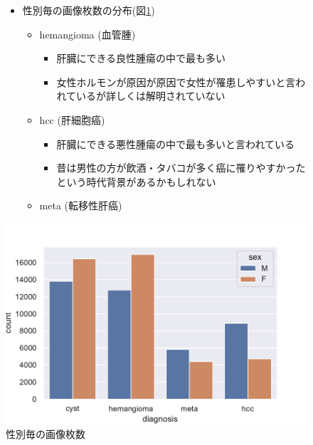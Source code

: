 \documentclass[a4j]{ujarticle}
\newcommand{\Fref}[1]{\mbox{図\ref{fig:#1}}}
\begin{document}
\begin{itemize}
			\begin{figure}[ht]
				\begin{minipage}{.59\textwidth}
					\begin{itemize}
						\item 性別毎の画像枚数の分布(\Fref{sex})
						\begin{itemize}
							\item hemangioma (血管腫)
							\begin{itemize}
								\item 肝臓にできる良性腫瘍の中で最も多い\footnotemark[4]
								\item 女性ホルモンが原因が原因で女性が罹患しやすいと言われているが詳しくは解明されていない\footnotemark[7]
							\end{itemize}
							\item hcc (肝細胞癌)
							\begin{itemize}
								\item 肝臓にできる悪性腫瘍の中で最も多いと言われている\footnotemark[4]
								\item 昔は男性の方が飲酒・タバコが多く癌に罹りやすかったという時代背景があるかもしれない
							\end{itemize}
							\item meta (転移性肝癌)
						\end{itemize}
					\end{itemize}
				\end{minipage}
				\begin{minipage}{.39\textwidth}
					\centering
					\includegraphics[width=\linewidth]{../fig/sex_a.pdf}
					\caption{性別毎の画像枚数}
					\label{fig:sex}
				\end{minipage}
			\end{figure}


\end{itemize}
\end{document}
